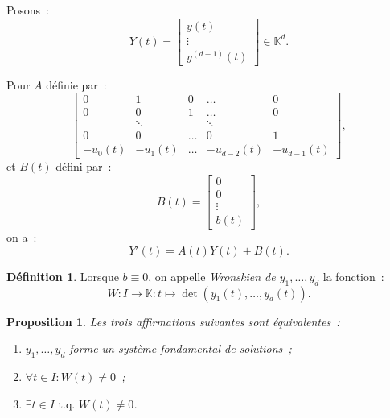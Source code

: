 \documentclass{report}
\newtheorem{prp}[thm]{Proposition}
\theoremstyle{definition}
\newtheorem{déf}[thm]{Définition}
\theoremstyle{remark}
\numberwithin{equation}{section}
\newcommand{\K}{\mathbb K}
\newcommand{\tq}{\text{ t.q. }}
\begin{document}
			Posons~:
			\begin{equation}
				Y(t)  = \begin{bmatrix}y(t) \\ \vdots \\ y^{(d-1)}(t)\end{bmatrix} \in \K^d.
			\end{equation}

			Pour $A$ définie par~:
			\begin{equation}
				\begin{bmatrix}
					0 & 1 & 0 & \ldots & 0 \\
					0 & 0 & 1 & \ldots & 0 \\
					  &  \ddots & & \ddots \\
					0 & 0 & \ldots & 0 & 1 \\
					-u_0(t) & -u_1(t) & \ldots & -u_{d-2}(t) & -u_{d-1}(t)
				\end{bmatrix},
			\end{equation}
			et $B(t)$ défini par~:
			\begin{equation}
				B(t) = \begin{bmatrix}0 \\ 0 \\ \vdots \\ b(t)\end{bmatrix},
			\end{equation}
			on a~:
			\begin{equation}
				Y'(t) = A(t)Y(t) + B(t).
			\end{equation}

			\begin{déf} Lorsque $b \equiv 0$, on appelle \textit{Wronskien de $y_1, \ldots, y_d$} la fonction~:
			\begin{equation}
				W : I \to \K : t \mapsto \det\left(y_1(t), \ldots, y_d(t)\right).
			\end{equation}
			\end{déf}

			\begin{prp} Les trois affirmations suivantes sont équivalentes~:
			\begin{enumerate}
				\item $y_1, \ldots, y_d$ forme un système fondamental de solutions~;
				\item $\forall t \in I : W(t) \neq 0$~;
				\item $\exists t \in I \tq W(t) \neq 0$.
			\end{enumerate}
			\end{prp}
\end{document}
